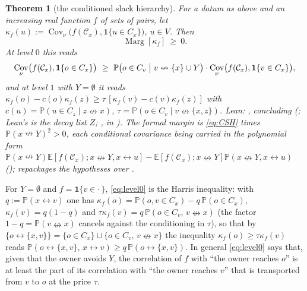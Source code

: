 \documentclass[11pt]{article}
\newtheorem{theorem}{Theorem}[section]
\theoremstyle{definition}
\theoremstyle{remark}
\newcommand{\PP}{\mathbb{P}}
\newcommand{\E}{\mathbb{E}}
\DeclareMathOperator{\Cov}{Cov}
\newcommand{\con}{\leftrightarrow}
\newcommand{\ncon}{\nleftrightarrow}
\newcommand{\one}{\mathbf 1}
\newcommand{\eC}{\mathcal{C}}
\newcommand{\Marg}{\operatorname{Marg}}
\begin{document}
\begin{theorem}[the conditioned slack hierarchy]\label{thm:CSH}
For a datum as above and an increasing real function $f$ of sets of pairs, let
$\kappa_f(u):=\Cov_\nu\bigl(f(\eC_x),\one\{u\in C_x\}\bigr)$, $u\in V$.  Then
\begin{equation}\label{eq:CSH}
 \Marg[\kappa_f]\ \ge\ 0 .
\end{equation}
At level $0$ this reads
\begin{equation}\label{eq:level0}
 \Cov_\nu\bigl(f(\eC_x),\one\{o\in C_x\}\bigr)\ \ge\ \PP\bigl(o\in C_v\bigm|v\ncon\{x\}\cup Y\bigr)\cdot\Cov_\nu\bigl(f(\eC_x),\one\{v\in C_x\}\bigr),
\end{equation}
and at level $1$ with $Y=\emptyset$ it reads $\kappa_f(o)-c(o)\kappa_f(z)\ge\tau\,[\kappa_f(v)-c(v)\kappa_f(z)]$ with
$c(u)=\PP(u\in C_z\mid z\ncon x)$, $\tau=\PP(o\in C_v\mid v\ncon\{x,z\})$.
\emph{Lean:} , concluding  (; Lean's  is the decoy list $Z$;
,  in ).  The formal margin is \eqref{eq:CSH} times $\PP(x\ncon Y)^2>0$, each conditional covariance being carried in the
polynomial form $\PP(x\ncon Y)\E[f(\eC_x);x\ncon Y,x\con u]-\E[f(\eC_x);x\ncon Y]\PP(x\ncon Y,x\con u)$ (); 
repackages the hypotheses over .
\end{theorem}
For $Y=\emptyset$ and $f=\one\{v\in\cdot\,\}$, \eqref{eq:level0} is the Harris inequality: with $q:=\PP(x\con v)$ one has
$\kappa_f(o)=\PP(o,v\in C_x)-q\,\PP(o\in C_x)$, $\kappa_f(v)=q(1-q)$ and $\tau\kappa_f(v)=q\,\PP(o\in C_v,\,v\ncon x)$ (the factor
$1-q=\PP(v\ncon x)$ cancels against the conditioning in $\tau$), so that by $\{o\con\{x,v\}\}=\{o\in C_x\}\sqcup\{o\in C_v,\,v\ncon x\}$ the
inequality $\kappa_f(o)\ge\tau\kappa_f(v)$ reads $\PP(o\con\{x,v\},\,x\con v)\ge q\,\PP(o\con\{x,v\})$.  In general \eqref{eq:level0} says that, given that the owner avoids $Y$, the
correlation of $f$ with ``the owner reaches $o$'' is at least the part of its correlation with ``the owner reaches $v$'' that is transported
from $v$ to $o$ at the price $\tau$.
\end{document}
